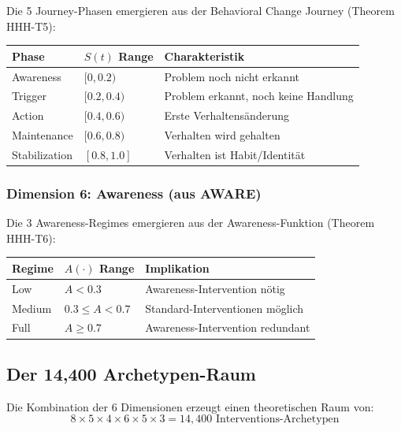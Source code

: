 Die 5 Journey-Phasen emergieren aus der Behavioral Change Journey (Theorem HHH-T5):
\begin{center}
\begin{tabular}{@{}lll@{}}
\toprule
\textbf{Phase} & \textbf{$S(t)$ Range} & \textbf{Charakteristik} \\
\midrule
Awareness & $[0, 0.2)$ & Problem noch nicht erkannt \\
Trigger & $[0.2, 0.4)$ & Problem erkannt, noch keine Handlung \\
Action & $[0.4, 0.6)$ & Erste Verhaltensänderung \\
Maintenance & $[0.6, 0.8)$ & Verhalten wird gehalten \\
Stabilization & $[0.8, 1.0]$ & Verhalten ist Habit/Identität \\
\bottomrule
\end{tabular}
\end{center}

\subsubsection{Dimension 6: Awareness (aus AWARE)}

Die 3 Awareness-Regimes emergieren aus der Awareness-Funktion (Theorem HHH-T6):
\begin{center}
\begin{tabular}{@{}lll@{}}
\toprule
\textbf{Regime} & \textbf{$A(\cdot)$ Range} & \textbf{Implikation} \\
\midrule
Low & $A < 0.3$ & Awareness-Intervention nötig \\
Medium & $0.3 \leq A < 0.7$ & Standard-Interventionen möglich \\
Full & $A \geq 0.7$ & Awareness-Intervention redundant \\
\bottomrule
\end{tabular}
\end{center}


\subsection{Der 14,400 Archetypen-Raum}
\label{sec:17-14400}

Die Kombination der 6 Dimensionen erzeugt einen theoretischen Raum von:
\begin{equation}
\boxed{8 \times 5 \times 4 \times 6 \times 5 \times 3 = 14{,}400 \text{ Interventions-Archetypen}}
\label{eq:17-14400}
\end{equation}

